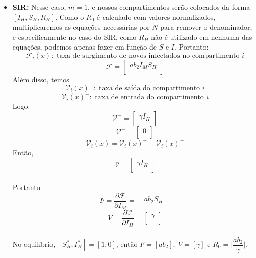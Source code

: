 \begin{itemize}
\item \textbf{SIR:}
Nesse caso, $m=1$, e nossos compartimentos serão colocados da forma $[I_H, S_H, R_H]$. Como o $R_0$ é calculado com valores normalizados, multiplicaremos as equações necessárias por $N$ para remover o denominador, e especificamente no caso do SIR, como $R_H$ não é utilizado em nenhuma das equações, podemos apenas fazer em função de $S$ e $I$. Portanto:
$$ {\mathcal F}_i(x): \text{ taxa de surgimento de novos infectados no compartimento } i $$
$$ {\mathcal F} =\begin{bmatrix}
a  b_2  I_M  S_H \\
\end{bmatrix} $$
Além disso, temos
$$ {\mathcal V}_i(x)^-: \text{ taxa de saída do compartimento } i $$
$$ {\mathcal V}_i(x)^+: \text{ taxa de entrada do compartimento } i $$
Logo:
$$
{\mathcal V^-} = \begin{bmatrix}
\gamma I_H\\
\end{bmatrix}
$$
$$
{\mathcal V^+} = \begin{bmatrix}
0\\
\end{bmatrix}
$$
$${\mathcal V}_i (x) = {\mathcal V}_i(x)^{-} - {\mathcal V}_i(x)^+$$
Então,
$$
{\mathcal V} =
\begin{bmatrix}
\gamma I_H\\
\end{bmatrix}
$$
\\
Portanto
$$ F = \dfrac{\partial{\mathcal F}}{\partial I_M} =\begin{bmatrix}
a  b_2  S_H \\
\end{bmatrix} $$
$$ V = \dfrac{\partial{\mathcal V}}{\partial I_H} =\begin{bmatrix}
\gamma \\
\end{bmatrix} $$
\\No equilíbrio, $[S_H^*, I_H^*] = [1,0]$, então $F=[a  b_2], \ V = [\gamma]$ e $R_0 = \Big | \dfrac{ab_2}{\gamma}\Big | $.


\end{itemize}
